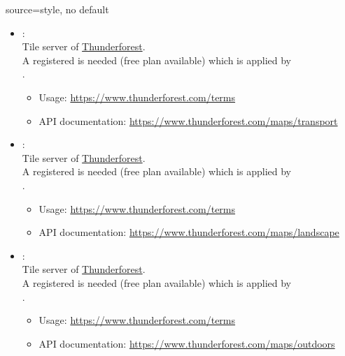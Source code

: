 \begin{docMrcKey}[supply]{source}{=}{style, no default}
\begin{itemize}
  \item{}:\\
    Tile server of \href{https://www.thunderforest.com}{Thunderforest}.\\
    A registered  is needed (free plan available)
    which is applied by\\
    .
    \begin{itemize}
    \item Usage: \url{https://www.thunderforest.com/terms}
    \item API documentation: \url{https://www.thunderforest.com/maps/transport}
    \end{itemize}

  \item{}:\\
    Tile server of \href{https://www.thunderforest.com}{Thunderforest}.\\
    A registered  is needed (free plan available)
    which is applied by\\
    .
    \begin{itemize}
    \item Usage: \url{https://www.thunderforest.com/terms}
    \item API documentation: \url{https://www.thunderforest.com/maps/landscape}
    \end{itemize}

\clearpage
  \item{}:\\
    Tile server of \href{https://www.thunderforest.com}{Thunderforest}.\\
    A registered  is needed (free plan available)
    which is applied by\\
    .
    \begin{itemize}
    \item Usage: \url{https://www.thunderforest.com/terms}
    \item API documentation: \url{https://www.thunderforest.com/maps/outdoors}
    \end{itemize}


\end{itemize}
\end{docMrcKey}
